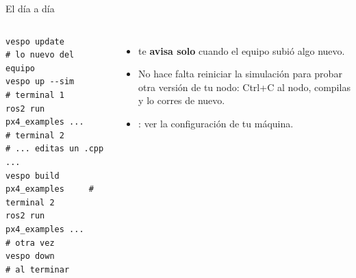 \begin{frame}[fragile]{El día a día}
  \begin{columns}[c]
    \begin{lstlisting}[style=bash]
vespo update                 # lo nuevo del equipo
vespo up --sim               # terminal 1
ros2 run px4_examples ...    # terminal 2
# ... editas un .cpp ...
vespo build px4_examples     # terminal 2
ros2 run px4_examples ...    # otra vez
vespo down                   # al terminar
    \end{lstlisting}
    \small
    \begin{itemize}
      \item {} te \textbf{avisa solo} cuando el equipo subió algo nuevo.
      \item No hace falta reiniciar la simulación para probar otra versión de tu nodo: Ctrl+C al nodo,
        compilas y lo corres de nuevo.
      \item {}: ver la configuración de tu máquina.
    \end{itemize}
  \end{columns}
\end{frame}
